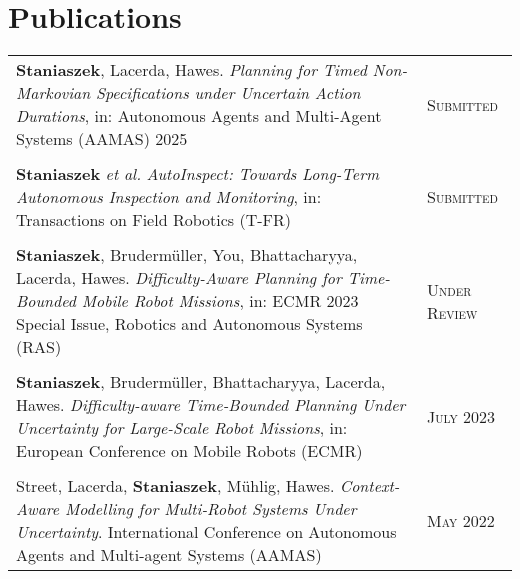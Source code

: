 \documentclass[a4paper,10pt]{article}
\newcommand{\datelen}{1.8cm}
\newcommand{\descrlen}{15.5cm}
\begin{document}
\section{Publications}
\begin{tabular}{p{\descrlen}|p{\datelen}}
  \textbf{Staniaszek}, Lacerda, Hawes. \emph{Planning for Timed Non-Markovian Specifications under Uncertain Action Durations}, in:  Autonomous Agents and Multi-Agent Systems (AAMAS) 2025&\textsc{Submitted}\\\multicolumn{2}{c}{}\\[-0.2cm]
  \textbf{Staniaszek} \emph{et al.} \emph{AutoInspect: Towards Long-Term Autonomous Inspection and Monitoring}, in: Transactions on Field Robotics (T-FR)&\textsc{Submitted}\\\multicolumn{2}{c}{}\\[-0.2cm]
    \textbf{Staniaszek}, Brudermüller, You, Bhattacharyya, Lacerda, Hawes. \emph{Difficulty-Aware Planning for Time-Bounded Mobile Robot Missions}, in:  ECMR 2023 Special Issue, Robotics and Autonomous Systems (RAS)&\textsc{Under Review}\\\multicolumn{2}{c}{}\\[-0.2cm]
  \textbf{Staniaszek}, Brudermüller, Bhattacharyya, Lacerda, Hawes. \emph{Difficulty-aware Time-Bounded Planning Under Uncertainty for Large-Scale Robot Missions}, in: European Conference on Mobile Robots (ECMR)&\textsc{July 2023}\\\multicolumn{2}{c}{}\\[-0.2cm]
  Street, Lacerda, \textbf{Staniaszek}, Mühlig, Hawes. \emph{Context-Aware Modelling for Multi-Robot Systems Under Uncertainty}. International Conference on Autonomous Agents and Multi-agent Systems (AAMAS) & \textsc{May 2022}\\

\end{tabular}
\end{document}
